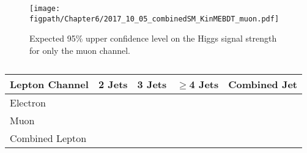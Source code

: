 \begin{figure}[!hbt]
    \centering
    \texttt{[image: \\figpath/Chapter6/2017\_10\_05\_combinedSM\_KinMEBDT\_muon.pdf]}
    \caption{Expected 95\% upper confidence level on the Higgs signal strength for only the muon channel.}
    \label{fig:limits_withSys_muon}
\end{figure}


\begin{table}[htbp]
\centering
\begin{tabular}{lrrr|r} \hline
Lepton Channel      & 2 Jets  & 3 Jets  & $\geqslant$4 Jets & Combined Jet \\\hline
Electron            &         &         &                   &              \\
Muon                &         &         &                   &              \\\hline
Combined Lepton     &         &         &                   &              \\\hline
\end{tabular}
\caption{}
\label{tab:95percent_upper_confidence_levels}
\end{table}


